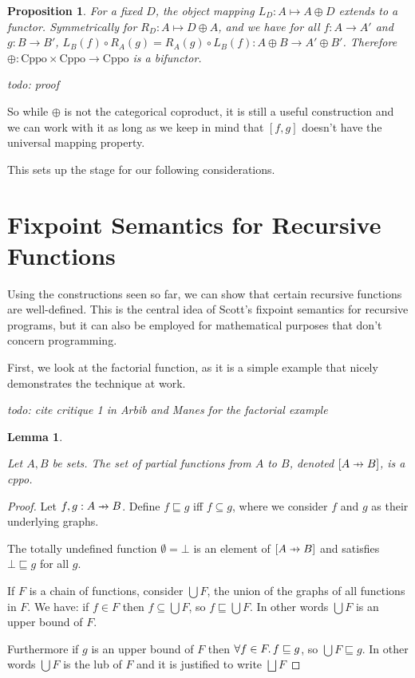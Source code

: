 \documentclass[a4paper]{article}
\newcommand{\below}{\sqsubseteq}
\newcommand{\arr}{\rightarrow}
\newcommand{\todo}[1]{\smallskip \noindent \emph{todo: #1} \smallskip}
\newcommand{\lub}{\bigsqcup}
\newcommand{\pfun}{\mathrel{\ooalign{\hfil$\mapstochar\mkern5mu$\hfil\cr$\to$\cr}}}
\newtheorem{proposition}[definition]{Proposition}
\newtheorem{lemma}[definition]{Lemma}
\begin{document}
\begin{proposition}

For a fixed $D$, the object mapping $L_D : A \mapsto A \oplus D$ extends to a
functor.  Symmetrically for $R_D : A \mapsto D \oplus A$, and we have for all $f
: A \arr A'$ and $g : B \arr B'$, $L_B(f) \circ R_A(g) = R_A(g) \circ L_B(f) : A
\oplus B \arr A' \oplus B'$.  Therefore $\oplus : \text{Cppo} \times \text{Cppo}
\arr \text{Cppo}$ is a bifunctor.

\end{proposition}

\todo{proof}

So while $\oplus$ is not the categorical coproduct, it is still a useful
construction and we can work with it as long as we keep in mind that $[f,g]$
doesn't have the universal mapping property.

This sets up the stage for our following considerations.

\section{Fixpoint Semantics for Recursive Functions}

Using the constructions seen so far, we can show that certain recursive
functions are well-defined. This is the central idea of Scott's fixpoint
semantics for recursive programs, but it can also be employed for mathematical
purposes that don't concern programming.

First, we look at the factorial function, as it is a simple example that nicely
demonstrates the technique at work.

\todo{cite critique 1 in Arbib and Manes for the factorial example}

\begin{lemma} \label{lemPartialFunctionSpaceCppo}

Let $A, B$ be sets. The set of partial functions from $A$ to $B$, denoted
$[A \pfun B]$, is a cppo.

\end{lemma}

\begin{proof}

Let $f, g : A \pfun B$. Define $f \below g$ iff $f \subseteq g$, where we
consider $f$ and $g$ as their underlying graphs.

The totally undefined function $\emptyset = \bot$ is an element of $[A \pfun B]$
and satisfies $\bot \below g$ for all $g$.

If $F$ is a chain of functions, consider $\bigcup F$, the union of the graphs of
all functions in $F$. We have: if $f \in F$ then $f \subseteq \bigcup F$, so $f
\below \bigcup F$.  In other words $\bigcup F$ is an upper bound of $F$.

Furthermore if $g$ is an upper bound of $F$ then $\forall f \in F \ldotp f
\below g$, so $\bigcup F \below g$. In other words $\bigcup F$ is the lub of $F$
and it is justified to write $\lub F$

\end{proof}
\end{document}
